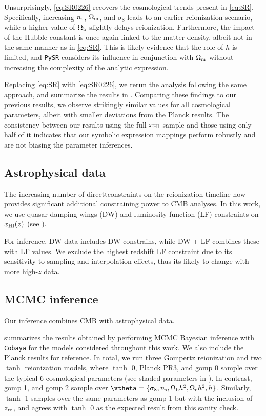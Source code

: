 Unsurprisingly, \cref{eq:SR0226} recovers the cosmological trends
present in \cref{eq:SR}.
Specifically, increasing $n_\mathrm{s}$, $\Omega_\mathrm{m}$, and $\sigma_8$ leads to an
earlier reionization scenario, while a higher value of $\Omega_\mathrm{b}$
slightly delays reionization.
Furthermore, the impact of the Hubble constant is once again linked to
the matter density, albeit not in the same manner as in
\cref{eq:SR}.
This is likely evidence that the role of $h$ is limited, and
\texttt{PySR} considers its influence in conjunction with $\Omega_\mathrm{m}$
without increasing the complexity of the analytic expression.

Replacing \cref{eq:SR} with \cref{eq:SR0226}, we rerun the analysis
following the same approach, and summarize the results in
.
Comparing these findings to our previous results, we observe strikingly
similar values for all cosmological parameters, albeit with smaller
deviations from the Planck results.
The consistency between our results using the full $x_{\mathrm{HI}}$ sample and
those using only half of it indicates that our symbolic expression
mappings perform robustly and are not biasing the parameter inferences.


\subsection*{Astrophysical data}
\label{ssec:xHI}
The increasing number of directtconstraints on the reionization timeline
now provides significant additional constraining power to CMB analyses.
In this work, we use quasar damping wings (DW) and luminosity function (LF)
constraints on $x_{\mathrm{HI}} (z)$ (see ).

For inference, DW data includes DW constrains, while DW + LF combines
these with LF values. We exclude the highest redshift LF constraint due to
its sensitivity to sampling and interpolation effects, thus its likely to change
with more high-$z$ data. 


\subsection*{MCMC inference}
\label{ssec:fits}
Our inference combines CMB with astrophysical data.

 summarizes the results obtained by performing MCMC
Bayesian inference with \texttt{Cobaya} for the models considered
throughout this work.
We also include the Planck results \cite{Planck2020a} for reference.
In total, we run three Gompertz reionization and two $\tanh$
reionization models, where $\tanh$ 0, Planck PR3, and gomp 0 sample over
the typical 6 cosmological parameters (see shaded parameters in
).
In contrast, gomp 1, and gomp 2 sample over $\vtheta = \{\sigma_8, \ns,
\Omegab h^2, \Omegac h^2, h\}$.
Similarly, $\tanh$ 1 samples over the same parameters as gomp 1 but with
the inclusion of $z_{\mathrm{re}}$, and agrees with $\tanh$ 0 as the expected
result from this sanity check.

